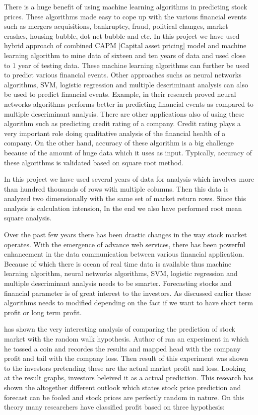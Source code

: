 \indent
There is a huge benefit of using machine learning algorithms in predicting stock prices. These algorithms made easy to cope up with the various financial events
such as mergers acquisitions, bankruptcy, fraud, political changes, market crashes, housing bubble, dot net bubble and etc. 
In this project we have used hybrid approach of combined CAPM [Capital asset pricing] model and machine learning algorithm to mine data of sixteen
and ten years of data and used close to 1 year of testing data. These machine learning algorithms can further be used to predict various financial events. 
Other approaches suchs as neural networks algorithms, SVM, logistic regression and multiple descriminant analysis can also be used to predict financial events. 
Example, \cite{Ref12} in their research proved neural networks algorithms performs better in predicting financial events as compared to multiple descriminant 
analysis. There are other applications also of using these algorithm such as predicting credit rating of a company. Credit rating plays a very important role 
doing qualitative analysis of the financial health of a company. On the other hand, accuracy of these algorithm is a big challenge because of the amount of huge data 
which it uses as input. Typically, accuracy of these algorithms is validated based on square root method. 

\indent
In this project we have used several years of data for analysis which involves more than hundred thousands of rows with multiple columns. Then this data is 
analyzed two dimensionally with the same set of market return rows. Since this analysis is calculation intension, In the end we also have performed root mean
square analysis. 

\indent
Over the past few years there has been drastic changes in the way stock market operates. With the emergence of advance web services, there has been powerful 
enhancement in the data communication between various financial application. Because of which there is ocean of real time data is available thus machine learning 
algorithm, neural networks algorithms, SVM, logistic regression and multiple descriminant analysis needs to be smarter. Forecasting stocks and financial parameter 
is of great interest to the investors. As discussed earlier these algorithms needs to modified depending on the fact if we want to have short term profit or long 
term profit. 

\indent 
\cite{Ref13} has shown the very interesting analysis of comparing the prediction of stock market with the random walk hypothesis. Author of \cite{Ref13} ran an 
experiment in which he tossed a coin and recordes the results and mapped head with the company profit and tail with the company loss. Then result of this experiment 
was shown to the investors pretending these are the actual market profit and loss. Looking at the result graphs, investors beleived it as a actual prediction. 
This research has shown the altogether different outlook which states stock price prediction and forecast can be fooled and stock prices are perfectly random in
nature. On this theory many researchers have classified profit based on three hypothesis:

